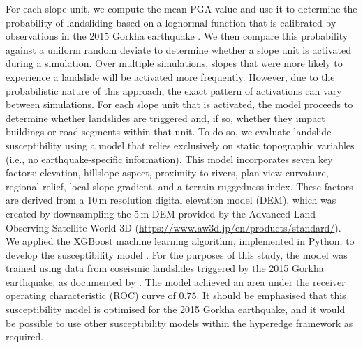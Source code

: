 \documentclass[nhess, manuscript]{copernicus}
\begin{document}
For each slope unit, we compute the mean PGA value and use it to determine the probability of landsliding based on a lognormal function that is calibrated by observations in the 2015 Gorkha earthquake \citep{Dunant2025}. We then compare this probability against a uniform random deviate to determine whether a slope unit is activated during a simulation. Over multiple simulations, slopes that were more likely to experience a landslide will be activated more frequently. However, due to the probabilistic nature of this approach, the exact pattern of activations can vary between simulations. For each slope unit that is activated, the model proceeds to determine whether landslides are triggered and, if so, whether they impact buildings or road segments within that unit. To do so, we evaluate landslide susceptibility using a model that relies exclusively on static topographic variables (i.e., no earthquake-specific information). This model incorporates seven key factors: elevation, hillslope aspect, proximity to rivers, plan-view curvature, regional relief, local slope gradient, and a terrain ruggedness index. These factors are derived from a 10\,\unit{m} resolution digital elevation model (DEM), which was created by downsampling the 5\,\unit{m} DEM provided by the Advanced Land Observing Satellite World 3D (\url{https://www.aw3d.jp/en/products/standard/}). We applied the XGBoost machine learning algorithm, implemented in Python, to develop the susceptibility model \citep{Dunant2025}. For the purposes of this study, the model was trained using data from coseismic landslides triggered by the 2015 Gorkha earthquake, as documented by \citet{Kincey2021}. The model achieved an area under the receiver operating characteristic (ROC) curve of $0.75$. It should be emphasised that this susceptibility model is optimised for the 2015 Gorkha earthquake, and it would be possible to use other susceptibility models within the hyperedge framework as required.
\end{document}
